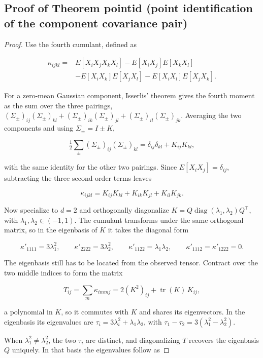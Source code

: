 \subsection{Proof of Theorem pointid (point identification of the
component covariance
pair)}\label{proof-of-theorem-pointid-point-identification-of-the-component-covariance-pair}

\begin{proof}
Use the fourth cumulant, defined as

\begin{align*}
\kappa_{ijkl}={}&E[X_iX_jX_kX_l]-E[X_iX_j]E[X_kX_l]\\
&-E[X_iX_k]E[X_jX_l]-E[X_iX_l]E[X_jX_k].
\end{align*}

For a zero-mean Gaussian component, Isserlis' theorem gives the fourth moment as the sum over the three pairings, $(\Sigma_\pm)_{ij}(\Sigma_\pm)_{kl}+(\Sigma_\pm)_{ik}(\Sigma_\pm)_{jl}+(\Sigma_\pm)_{il}(\Sigma_\pm)_{jk}$. Averaging the two components and using $\Sigma_\pm=I\pm K$,

$$\tfrac12\sum_{\pm}(\Sigma_\pm)_{ij}(\Sigma_\pm)_{kl}=\delta_{ij}\delta_{kl}+K_{ij}K_{kl},$$

with the same identity for the other two pairings. Since $E[X_iX_j]=\delta_{ij}$, subtracting the three second-order terms leaves

$$\kappa_{ijkl}=K_{ij}K_{kl}+K_{ik}K_{jl}+K_{il}K_{jk}.$$

Now specialize to $d=2$ and orthogonally diagonalize $K=Q\operatorname{diag}(\lambda_1,\lambda_2)Q^\top$, with $\lambda_1,\lambda_2\in(-1,1)$. The cumulant transforms under the same orthogonal matrix, so in the eigenbasis of $K$ it takes the diagonal form

$$\kappa'_{1111}=3\lambda_1^2,\qquad \kappa'_{2222}=3\lambda_2^2,\qquad
\kappa'_{1122}=\lambda_1\lambda_2,\qquad
\kappa'_{1112}=\kappa'_{1222}=0.$$

The eigenbasis still has to be located from the observed tensor. Contract over the two middle indices to form the matrix

$$T_{ij}=\sum_m\kappa_{i m m j}=2(K^2)_{ij}+\operatorname{tr}(K)\,K_{ij},$$

a polynomial in $K$, so it commutes with $K$ and shares its eigenvectors. In the eigenbasis its eigenvalues are $\tau_i=3\lambda_i^2+\lambda_1\lambda_2$, with $\tau_1-\tau_2=3(\lambda_1^2-\lambda_2^2)$.

When $\lambda_1^2\ne\lambda_2^2$, the two $\tau_i$ are distinct, and diagonalizing $T$ recovers the eigenbasis $Q$ uniquely. In that basis the eigenvalues follow as


\end{proof}
